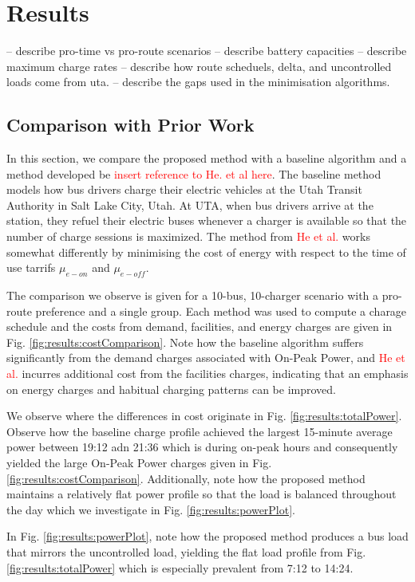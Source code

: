 \section{Results}
-- describe pro-time vs pro-route scenarios
-- describe battery capacities
-- describe maximum charge rates
-- describe how route scheduels, delta, and uncontrolled loads come from uta.
-- describe the gaps used in the minimisation algorithms.
\subsection{Comparison with Prior Work}
In this section, we compare the proposed method with a baseline algorithm and a method developed be \textcolor{red}{insert reference to He. et al here}. The baseline method models how bus drivers charge their electric vehicles at the Utah Transit Authority in Salt Lake City, Utah. At UTA, when bus drivers arrive at the station, they refuel their electric buses whenever a charger is available so that the number of charge sessions is maximized. The method from \textcolor{red}{He et al.} works somewhat differently by minimising the cost of energy with respect to the time of use tarrifs $\mu_{e-on}$ and $\mu_{e-off}$.
\par The comparison we observe is given for a 10-bus, 10-charger scenario with a pro-route preference and a single group. Each method was used to compute a charage schedule and the costs from demand, facilities, and energy charges are given in Fig. \ref{fig:results:costComparison}. Note how the baseline algorithm suffers significantly from the demand charges associated with On-Peak Power, and \textcolor{red}{He et al.} incurres additional cost from the facilities charges, indicating that an emphasis on energy charges and habitual charging patterns can be improved.
\par We observe where the differences in cost originate in Fig. \ref{fig:results:totalPower}. Observe how the baseline charge profile achieved the largest 15-minute average power between 19:12 adn 21:36 which is during on-peak hours and consequently yielded the large On-Peak Power charges given in Fig. \ref{fig:results:costComparison}. Additionally, note how the proposed method maintains a relatively flat power profile so that the load is balanced throughout the day which we investigate in Fig. \ref{fig:results:powerPlot}.
\par In Fig. \ref{fig:results:powerPlot}, note how the proposed method produces a bus load that mirrors the uncontrolled load, yielding the flat load profile from Fig. \ref{fig:results:totalPower} which is especially prevalent from 7:12 to 14:24.
 


